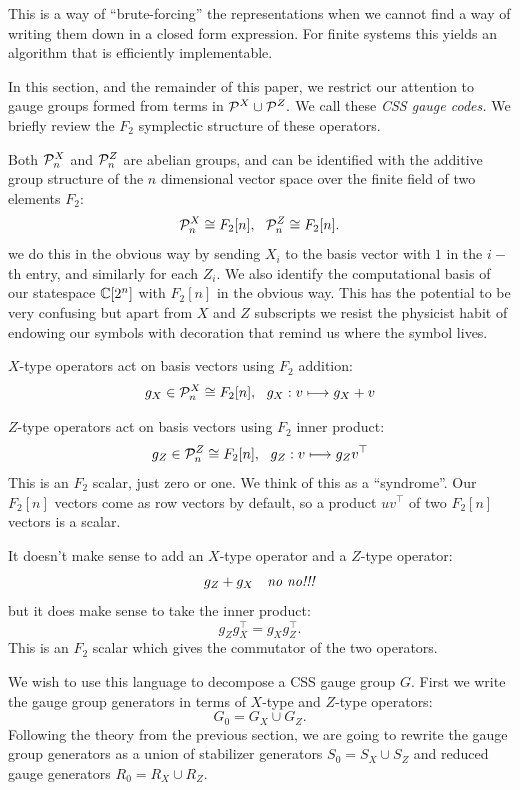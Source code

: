 \documentclass[12pt]{article}
\begin{document}
\def\Cn{\Complex[2^n]}
\def\Cr{\Complex[2^r]}
\def\Fn{F_2[n]}
\def\Fr{F_2[r]}

This is a way of ``brute-forcing'' the representations when
we cannot find a way of writing them down in a closed form expression.
For finite systems this yields an algorithm that is efficiently implementable.

In this section, and the remainder of this paper,
we restrict our
attention to gauge groups formed from terms 
in $\mathcal{P}^X\cup\mathcal{P}^Z.$
We call these \emph{CSS gauge codes.}
We briefly review the $F_2$ symplectic structure of
these operators.

Both $\mathcal{P}^X_n$ and $\mathcal{P}^Z_n$ are abelian groups,
and can be identified with the additive 
group structure of the $n$ dimensional vector space
over the finite field of two elements $F_2:$
$$
    \Pauli^X_n \cong \Fn,  \ \ 
    \Pauli^Z_n \cong \Fn. 
$$
we do this in the obvious way by sending $X_i$ to the basis vector with
$1$ in the $i-$th entry, and similarly for each $Z_i$. 
We also identify the computational basis of our statespace $\mathbb{C}[2^n]$
with $\Fn$ in the obvious way.
This has the potential to be very confusing but 
apart from $X$ and $Z$ subscripts
we resist the physicist habit of endowing our symbols with decoration that remind us where the
symbol lives.

$X$-type operators act on basis vectors using $F_2$ addition:
$$
    g_X \in \Pauli^X_n \cong \Fn, \ \ g_X : v \longmapsto g_X + v
$$

$Z$-type operators act on basis vectors using $F_2$ inner product:
$$
    g_Z \in \Pauli^Z_n \cong \Fn, \ \ g_Z : v \longmapsto g_Z v^\top
$$
This is an $F_2$ scalar, just zero or one. We think of this
as a ``syndrome''.
Our $\Fn$ vectors come as row vectors by default, so a product $u v^\top$ of
two $\Fn$ vectors is a scalar.

It doesn't make sense to add an $X$-type operator and
a $Z$-type operator:
$$
    g_Z + g_X \ \ \ \mbox{\emph{no no!!!}}
$$
but it does make sense to take the inner product:
$$
    g_Z g_X^\top = g_X g_Z^\top.
$$
This is an $F_2$ scalar which gives the commutator of the 
two operators.

We wish to use this language to decompose a CSS gauge group $G.$
First we write the gauge group generators in terms of
$X$-type and $Z$-type operators:
$$
    G_0 = G_X \cup G_Z.
$$
Following the theory from the previous section,
we are going to rewrite the gauge group generators
as a union of stabilizer generators $S_0 = S_X \cup S_Z$
and reduced gauge generators $R_0 = R_X \cup R_Z.$
\end{document}
